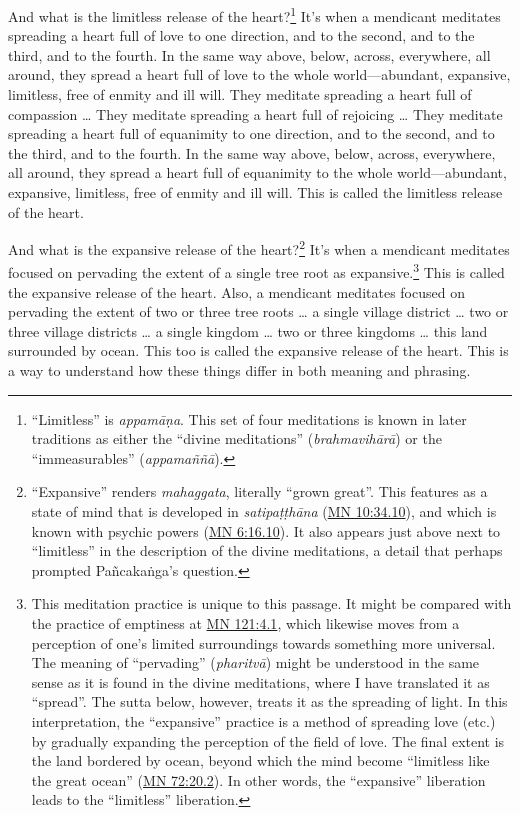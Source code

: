 \documentclass[12pt,openany]{book}%
\begin{document}
And what is the limitless release of the heart?\footnote{“Limitless” is \textit{\textsanskrit{appamāṇa}}. This set of four meditations is known in later traditions as either the “divine meditations” (\textit{\textsanskrit{brahmavihārā}}) or the “immeasurables” (\textit{\textsanskrit{appamaññā}}). } It’s when a mendicant meditates spreading a heart full of love to one direction, and to the second, and to the third, and to the fourth. In the same way above, below, across, everywhere, all around, they spread a heart full of love to the whole world—abundant, expansive, limitless, free of enmity and ill will. They meditate spreading a heart full of compassion … They meditate spreading a heart full of rejoicing … They meditate spreading a heart full of equanimity to one direction, and to the second, and to the third, and to the fourth. In the same way above, below, across, everywhere, all around, they spread a heart full of equanimity to the whole world—abundant, expansive, limitless, free of enmity and ill will. This is called the limitless release of the heart. 

And what is the expansive release of the heart?\footnote{“Expansive” renders \textit{mahaggata}, literally “grown great”. This features as a state of mind that is developed in \textit{\textsanskrit{satipaṭṭhāna}} (\href{https://suttacentral.net/mn10/en/sujato\#34.10}{MN 10:34.10}), and which is known with psychic powers (\href{https://suttacentral.net/mn6/en/sujato\#16.10}{MN 6:16.10}). It also appears just above next to “limitless” in the description of the divine meditations, a detail that perhaps prompted \textsanskrit{Pañcakaṅga}’s question. } It’s when a mendicant meditates focused on pervading the extent of a single tree root as expansive.\footnote{This meditation practice is unique to this passage. It might be compared with the practice of emptiness at \href{https://suttacentral.net/mn121/en/sujato\#4.1}{MN 121:4.1}, which likewise moves from a perception of one’s limited surroundings towards something more universal. The meaning of “pervading” (\textit{\textsanskrit{pharitvā}}) might be understood in the same sense as it is found in the divine meditations, where I have translated it as “spread”. The sutta below, however, treats it as the spreading of light. In this interpretation, the “expansive” practice is a method of spreading love (etc.) by gradually expanding the perception of the field of love. The final extent is the land bordered by ocean, beyond which the mind become “limitless like the great ocean” (\href{https://suttacentral.net/mn72/en/sujato\#20.2}{MN 72:20.2}). In other words, the “expansive” liberation leads to the “limitless” liberation. } This is called the expansive release of the heart. Also, a mendicant meditates focused on pervading the extent of two or three tree roots … a single village district … two or three village districts … a single kingdom … two or three kingdoms … this land surrounded by ocean. This too is called the expansive release of the heart. This is a way to understand how these things differ in both meaning and phrasing. 
\end{document}
